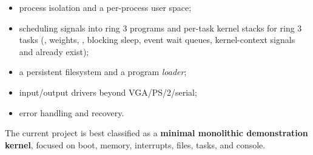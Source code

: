 \begin{itemize}
  \item process isolation and a per-process user space;
  \item scheduling signals into ring 3 programs and per-task kernel stacks for
        ring 3 tasks (, weights, , blocking sleep,
        event wait queues, kernel-context signals and  already
        exist);
  \item a persistent filesystem and a program \emph{loader};
  \item input/output drivers beyond VGA/PS/2/serial;
  \item error handling and recovery.
\end{itemize}

The current project is best classified as a \textbf{minimal monolithic
demonstration kernel}, focused on boot, memory, interrupts, files, tasks,
and console.
